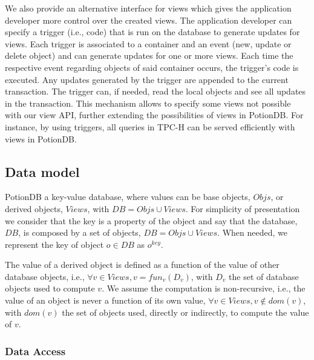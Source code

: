 \documentclass[sigplan,10pt]{acmart}
\begin{document}
We also provide an alternative interface for views which gives the application developer more control over the created views.
The application developer can specify a trigger (i.e., code) that is run on the database to generate updates for views.
Each trigger is associated to a container and an event (new, update or delete object) and can generate updates for one or more views.
Each time the respective event regarding objects of said container occurs, the trigger's code is executed.
Any updates generated by the trigger are appended to the current transaction.
The trigger can, if needed, read the local objects and see all updates in the transaction. %
This mechanism allows to specify some views not possible with our view API, further extending the possibilities of views in PotionDB.
For instance, by using triggers, all queries in TPC-H can be served efficiently with views in PotionDB.

\subsection{Data model}

PotionDB a key-value database,  where values can be base objects, $Objs$,  or derived objects,
$Views$, with $DB = Objs \cup Views$. For simplicity of presentation we consider that the key is a property of
the object and say that the database, $DB$, is composed by a set of objects, $DB = Objs \cup Views$. 
When needed, we represent the key of object $o \in DB$ as $o^{key}$.

The value of a derived object is defined as a function of the value of other database objects, i.e.,
$\forall v \in Views, v=fun_v(D_v)$, with  $D_v$ the set of database objects used to compute $v$.
We assume the computation is non-recursive, i.e., the value of an object is never a function of its own value, 
$\forall v \in Views, v \not \in dom(v)$, with $dom(v)$ the set of objects used, directly or indirectly, to 
compute the value of $v$.

\subsubsection{Data Access}
\end{document}
